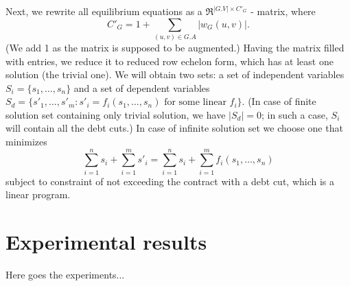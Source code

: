 \documentclass[10pt]{article}
\newcommand{\RR}{\mathfrak{R}}
\begin{document}
Next, we rewrite all equilibrium equations as a $\RR^{|G.V| \times C'_G}$ - matrix, where 
\[
C'_G = 1 + \sum_{(u, v) \in G.A} |w_G(u, v)|.
\]
(We add 1 as the matrix is supposed to be augmented.) Having the matrix filled with entries, we reduce it to reduced row echelon form, which has at least one solution (the trivial one).
We will obtain two sets: a set of independent variables $S_i = \{ s_1, \dots, s_n \}$ and a set of dependent variables $S_d = \{ s'_1, \dots, s'_m \colon s'_i = f_i(s_1, \dots, s_n) \text{ for some linear } f_i \}$. (In case of finite solution set containing only trivial solution, we have $|S_d| = 0$; in such a case, $S_i$ will contain all the debt cuts.) In case of infinite solution set we choose one that minimizes
\[
\sum_{i = 1}^{n} s_i + \sum_{i = 1}^{m} s'_i = \sum_{i = 1}^{n} s_i + \sum_{i = 1}^{m} f_i(s_1, \dots, s_n) 
\]
subject to constraint of not exceeding the contract with a debt cut, which is a linear program.

\section{Experimental results}
Here goes the experiments...
\end{document}
